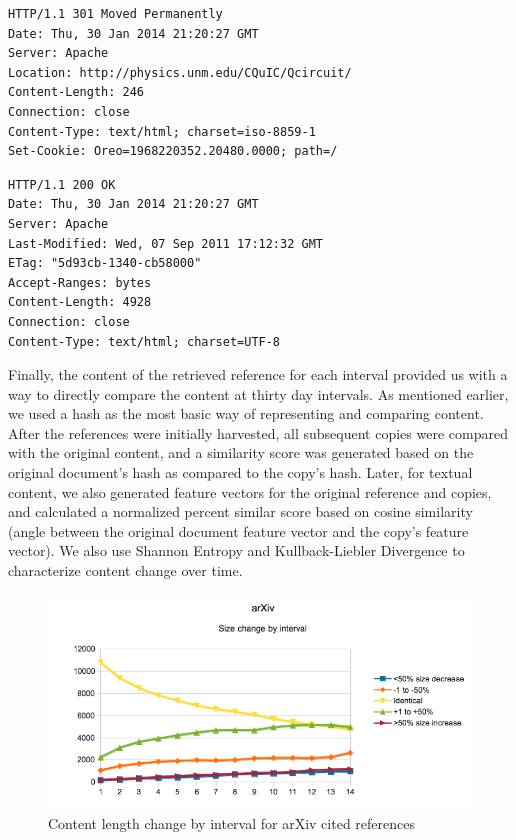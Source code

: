 \documentclass[12pt]{article}
\begin{document}
\begin{lstlisting}[caption=301 Response]
HTTP/1.1 301 Moved Permanently
Date: Thu, 30 Jan 2014 21:20:27 GMT
Server: Apache
Location: http://physics.unm.edu/CQuIC/Qcircuit/
Content-Length: 246
Connection: close
Content-Type: text/html; charset=iso-8859-1
Set-Cookie: Oreo=1968220352.20480.0000; path=/
\end{lstlisting}

\begin{lstlisting}[caption=200 Response]
HTTP/1.1 200 OK
Date: Thu, 30 Jan 2014 21:20:27 GMT
Server: Apache
Last-Modified: Wed, 07 Sep 2011 17:12:32 GMT
ETag: "5d93cb-1340-cb58000"
Accept-Ranges: bytes
Content-Length: 4928
Connection: close
Content-Type: text/html; charset=UTF-8
\end{lstlisting}


Finally, the content of the retrieved reference for each interval provided us with a way to directly compare the content at thirty day intervals. As mentioned earlier, we used a hash as the most basic way of representing and comparing content. After the references were initially harvested, all subsequent copies were compared with the original content, and a similarity score was generated based on the original document's hash as compared to the copy's hash. Later, for textual content, we also generated feature vectors for the original reference and copies, and calculated a normalized percent similar score based on cosine similarity (angle between the original document feature vector and the copy's feature vector). We also use Shannon Entropy and Kullback-Liebler Divergence to characterize content change over time.

\begin{figure}[ht!]
  \includegraphics[width=\linewidth,natwidth=610,natheight=642]{figure3.png}
  \caption{Content length change by interval for arXiv cited references}
  \label{fig:arxivclchange}
\end{figure}
\end{document}
